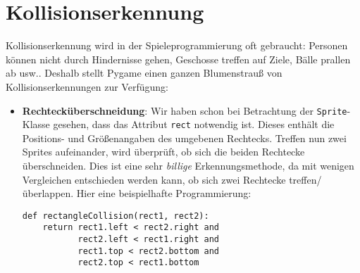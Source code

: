 \newpage
\section{Kollisionserkennung}
Kollisionserkennung wird in der Spieleprogrammierung  oft gebraucht: Personen können nicht durch Hindernisse gehen, Geschosse treffen auf Ziele, Bälle prallen ab usw.. Deshalb stellt Pygame einen ganzen Blumenstrauß von Kollisionserkennungen zur Verfügung:

\begin{itemize}
    \item \textbf{Rechtecküberschneidung}: Wir haben schon bei Betrachtung der \texttt{Sprite}-Klasse gesehen, dass das Attribut \texttt{rect} notwendig ist. Dieses enthält die Positions- und Größenangaben des umgebenen Rechtecks. Treffen nun zwei Sprites aufeinander, wird überprüft, ob sich die beiden Rechtecke überschneiden. Dies ist eine sehr \emph{billige} Erkennungsmethode, da mit wenigen Vergleichen entschieden werden kann, ob sich zwei Rechtecke treffen/überlappen. Hier eine beispielhafte Programmierung:
\lstset{firstnumber=1}
\begin{lstlisting}
def rectangleCollision(rect1, rect2):
    return rect1.left < rect2.right and
           rect2.left < rect1.right and
           rect1.top < rect2.bottom and
           rect2.top < rect1.bottom
\end{lstlisting}


\begin{figure}[H]
\begin{center}

\end{center}
\end{figure}
\end{itemize}
